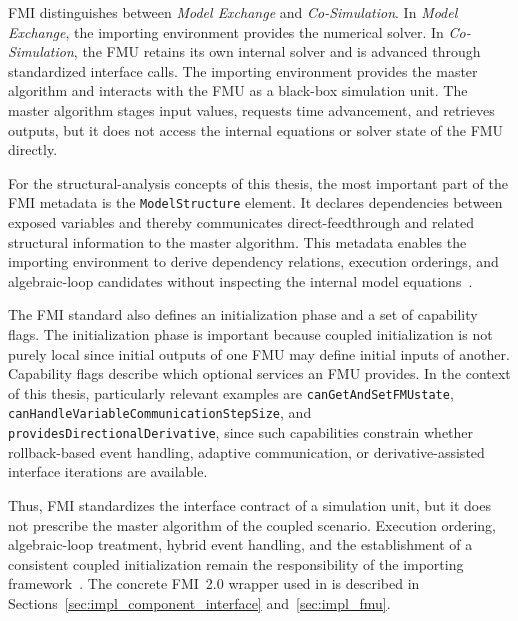 \ac{FMI} distinguishes between \emph{Model Exchange} and \emph{Co-Simulation}.
In \emph{Model Exchange}, the importing environment provides the numerical solver.
In \emph{Co-Simulation}, the \ac{FMU} retains its own internal solver and is advanced through standardized interface calls.
The importing environment provides the master algorithm and interacts with the \ac{FMU} as a black-box simulation unit.
The master algorithm stages input values, requests time advancement, and retrieves outputs, but it does not access the internal equations or solver state of the \ac{FMU} directly.

For the structural-analysis concepts of this thesis, the most important part of the FMI metadata is the \texttt{ModelStructure} element.
It declares dependencies between exposed variables and thereby communicates direct-feedthrough and related structural information to the master algorithm.
This metadata enables the importing environment to derive dependency relations, execution orderings, and algebraic-loop candidates without inspecting the internal model equations~\cite{modelica_association_project_fmi_functional_2014}.

The FMI standard also defines an initialization phase and a set of capability flags.
The initialization phase is important because coupled initialization is not purely local since initial outputs of one \ac{FMU} may define initial inputs of another.
Capability flags describe which optional services an \ac{FMU} provides.
In the context of this thesis, particularly relevant examples are \texttt{canGetAndSetFMUstate}, \texttt{canHandleVariableCommunicationStepSize}, and \texttt{providesDirectionalDerivative}, since such capabilities constrain whether rollback-based event handling, adaptive communication, or derivative-assisted interface iterations are available.

Thus, \ac{FMI} standardizes the interface contract of a simulation unit, but it does not prescribe the master algorithm of the coupled scenario.
Execution ordering, algebraic-loop treatment, hybrid event handling, and the establishment of a consistent coupled initialization remain the responsibility of the importing framework~\cite{gomes_co-simulation_2019}.
The concrete \ac{FMI}~2.0 wrapper used in \syssimx{} is described in Sections~\ref{sec:impl_component_interface} and~\ref{sec:impl_fmu}.
